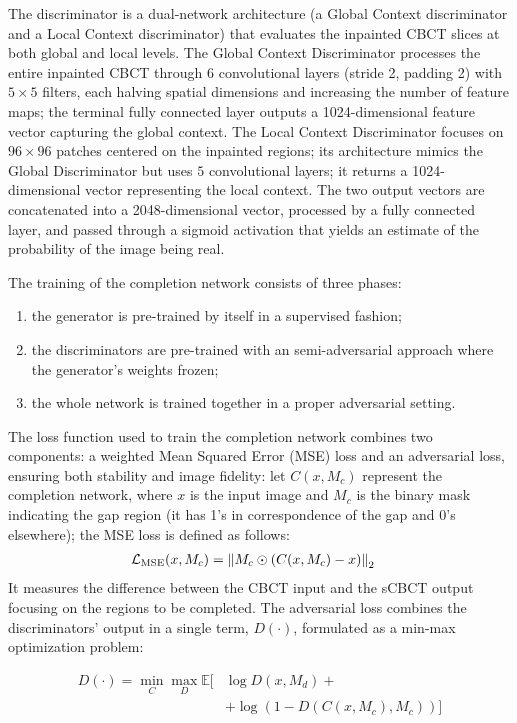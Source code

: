 The discriminator is a dual-network architecture (a Global Context discriminator and a Local Context discriminator) that evaluates the inpainted CBCT slices at both global and local levels.
The Global Context Discriminator processes the entire inpainted CBCT through $6$ convolutional layers (stride 2, padding 2) with $5\times 5$ filters, each halving spatial dimensions and increasing the number of feature maps; the terminal fully connected layer outputs a 1024-dimensional feature vector capturing the global context.
The Local Context Discriminator focuses on $96\times 96$ patches centered on the inpainted regions; its architecture mimics the Global Discriminator but uses $5$ convolutional layers; it returns a 1024-dimensional vector representing the local context.
The two output vectors are concatenated into a 2048-dimensional vector, processed by a fully connected layer, and passed through a sigmoid activation that yields an estimate of the probability of the image being real.

The training of the completion network consists of three phases: 
\begin{enumerate}
    \item the generator is pre-trained by itself in a supervised fashion;
    \item the discriminators are pre-trained with an semi-adversarial approach where the generator's weights frozen; 
    \item the whole network is trained together in a proper adversarial setting.
\end{enumerate}
The loss function used to train the completion network combines two components: a weighted Mean Squared Error (MSE) loss and an adversarial loss, ensuring both stability and image fidelity: let \( C(x, M_c) \) represent the completion network, where \( x \) is the input image and \( M_c \) is the binary mask indicating the gap region (it has 1's in correspondence of the gap and 0's elsewhere); the MSE loss is defined as follows:
\begin{align}
    \mathcal{L}_{\text{MSE}}(x, M_c) &= \left\| M_c \odot (C(x, M_c) - x) \right\|_2
\label{eq:mse}
\end{align}
It measures the difference between the CBCT input and the sCBCT output focusing on the regions to be completed.
The adversarial loss combines the discriminators' output in a single term,  \( D(\cdot) \), formulated as a min-max optimization problem: 

\begin{align}
    D(\cdot) = \min_C \max_D \mathbb{E} \Big[ & \log D(x, M_d) + \nonumber \\
    & + \log(1 - D(C(x, M_c), M_c)) \Big]
\label{eq:minmax_gan}
\end{align}


